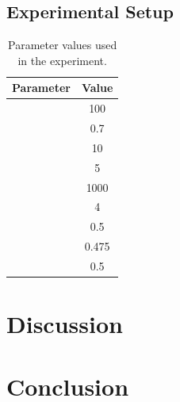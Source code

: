 \documentclass[a4paper,12pt]{article}
\begin{document}
    \subsection{Experimental Setup}
        \par{
            \begin{table}[ht]
                \centering
                    \small 
                    \begin{tabular}{ | l | c | }

                        \hline
                        \textbf{Parameter} & \textbf{Value} \\
                        \hline  
                        \nameref{subsubsec:mg} & 100 \\
                        \hline 
                        \nameref{subsubsec:kf} & 0.7 \\
                        \hline 
                        \nameref{subsubsec:mmd} & 10 \\
                        \hline 
                        \nameref{subsubsec:cmd} & 5 \\
                        \hline 
                        \nameref{subsubsec:ps} & 1000 \\
                        \hline 
                        \nameref{subsubsec:ts} & 4 \\
                        \hline 
                        \nameref{subsubsec:car} & 0.5 \\
                        \hline 
                        \nameref{subsubsec:mar} & 0.475 \\
                        \hline 
                        \nameref{subsubsec:har} & 0.5 \\
                        \hline 
                    \end{tabular}
                    \caption{Parameter values used in the experiment.} 
            \end{table} 
        }
       

\section{Discussion} \label{sec:discussion}
    \par{

    }
\section{Conclusion} \label{sec:conclusion}
    \par{

    }
\newpage
% 

\end{document}
